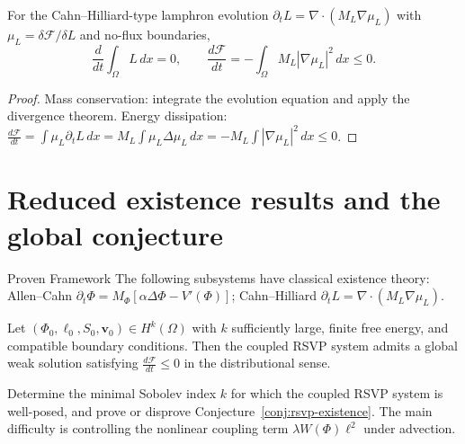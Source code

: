 \begin{theorem}
  \label{thm:lamphron-mass}
  \statusproven{}
  For the Cahn--Hilliard-type lamphron evolution
  $\partial_t L = \nabla\cdot(M_L\nabla\mu_L)$
  with $\mu_L = \delta\mathcal{F}/\delta L$ and no-flux boundaries,
  \[
    \frac{d}{dt}\int_\Omega L\,dx = 0,
    \qquad
    \frac{d\mathcal{F}}{dt}
    = -\int_\Omega M_L|\nabla\mu_L|^2\,dx \leq 0.
  \]
\end{theorem}

\begin{proof}
  Mass conservation: integrate the evolution equation and apply
  the divergence theorem.
  Energy dissipation: $\frac{d\mathcal{F}}{dt}
  = \int\mu_L\partial_tL\,dx = M_L\int\mu_L\Delta\mu_L\,dx
  = -M_L\int|\nabla\mu_L|^2\,dx \leq 0$.
\end{proof}

\section{Reduced existence results and the global conjecture}

\begin{StatusBox}{Proven Framework}
  The following subsystems have classical existence theory:
  Allen--Cahn $\partial_t\Phi = M_\Phi[\alpha\Delta\Phi - V'(\Phi)]$;
  Cahn--Hilliard $\partial_t L = \nabla\cdot(M_L\nabla\mu_L)$.
\end{StatusBox}

\begin{conjecture}
  \label{conj:rsvp-existence}
  \statusconjectured{}
  Let $(\Phi_0, \ell_0, S_0, \mathbf{v}_0) \in H^k(\Omega)$
  with $k$ sufficiently large, finite free energy, and
  compatible boundary conditions.
  Then the coupled RSVP system admits a global weak solution
  satisfying $\frac{d\mathcal{F}}{dt} \leq 0$ in the
  distributional sense.
\end{conjecture}

\begin{OpenQuestion}
  Determine the minimal Sobolev index $k$ for which the
  coupled RSVP system is well-posed, and prove or disprove
  Conjecture~\ref{conj:rsvp-existence}.
  The main difficulty is controlling the nonlinear coupling
  term $\lambda W(\Phi)\ell^2$ under advection.
\end{OpenQuestion}
